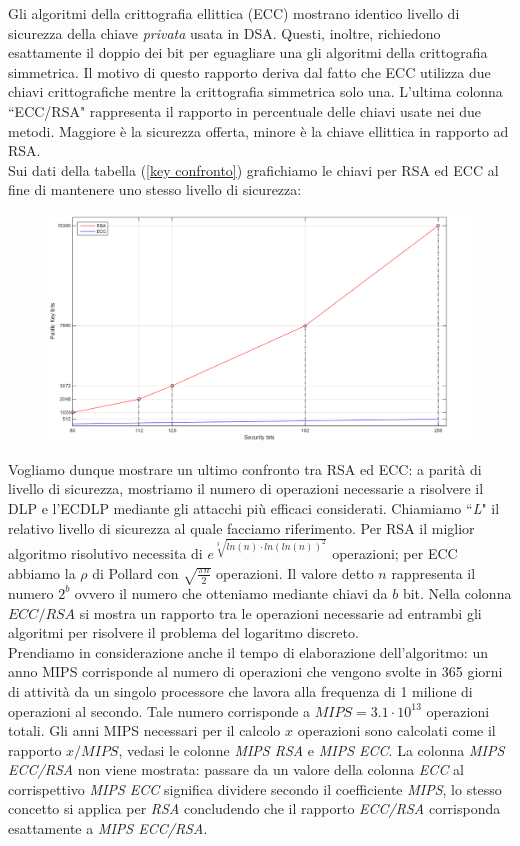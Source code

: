 \documentclass[a4paper,12pt]{tesiinfo}
\newcommand\ddfrac[2]{\frac{\displaystyle #1}{\displaystyle #2}}
\begin{document}
Gli algoritmi della crittografia ellittica (ECC) mostrano identico livello di sicurezza della chiave \textit{privata} usata in DSA. Questi, inoltre, richiedono esattamente il doppio dei bit per eguagliare una gli algoritmi della crittografia simmetrica. Il motivo di questo rapporto deriva dal fatto che ECC utilizza due chiavi crittografiche mentre la crittografia simmetrica solo una. L'ultima colonna ``ECC/RSA" rappresenta il rapporto in percentuale delle chiavi usate nei due metodi. Maggiore \`e la sicurezza offerta, minore \`e la chiave ellittica in rapporto ad RSA.
\\
Sui dati della tabella (\ref{key confronto}) grafichiamo le chiavi per RSA ed ECC al fine di mantenere uno stesso livello di sicurezza:
\begin{figure}[H]
\includegraphics[scale=0.55]{RSAvECC_matlab}
 \label{rsaveccpercent}
\end{figure}
Vogliamo dunque mostrare un ultimo confronto tra RSA ed ECC: a parit\`a di livello di sicurezza, mostriamo il numero di operazioni necessarie a risolvere il DLP e l'ECDLP mediante gli attacchi pi\`u efficaci considerati.
Chiamiamo ``\textit{L}" il relativo livello di sicurezza al quale facciamo riferimento. Per RSA il miglior algoritmo risolutivo necessita di $e^{\sqrt[3]{ln(n) \cdot ln( ln( n) )^2}}$ operazioni; per ECC abbiamo la $\rho$ di Pollard con $\sqrt{\ddfrac{\pi n}{2}}$ operazioni. Il valore detto $n$ rappresenta il numero $2^b$ ovvero il numero che otteniamo mediante chiavi da $b$ bit. Nella colonna $ECC/RSA$ si mostra un rapporto tra le operazioni necessarie ad entrambi gli algoritmi per risolvere il problema del logaritmo discreto.
\\
Prendiamo in considerazione anche il tempo di elaborazione dell'algoritmo: un anno MIPS corrisponde al numero di operazioni che vengono svolte in 365 giorni di attivit\`a da un singolo processore che lavora alla frequenza di 1 milione di operazioni al secondo. Tale numero corrisponde a $MIPS=3.1 \cdot 10^{13}$ operazioni totali. Gli anni MIPS necessari per il calcolo $x$ operazioni sono calcolati come il rapporto $x / MIPS$, vedasi le colonne \textit{MIPS RSA} e \textit{MIPS ECC}. La colonna \textit{MIPS ECC/RSA} non viene mostrata: passare da un valore della colonna \textit{ECC} al corrispettivo \textit{MIPS ECC} significa dividere secondo il coefficiente \textit{MIPS}, lo stesso concetto si applica per \textit{RSA} concludendo che il rapporto \textit{ECC/RSA} corrisponda esattamente a \textit{MIPS ECC/RSA}.
\end{document}
